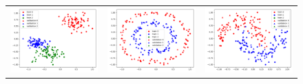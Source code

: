 \documentclass[12pt, a4paper,  nobibnotes]{article}
\begin{document}
\begin{figure}[H]
    \centering
    \begin{tabular}{ccc}
      \includegraphics[width=\thisfigurewidth\textwidth]{figures/fig_dataset_blobs.png} & 
      \includegraphics[width=\thisfigurewidth\textwidth]{figures/fig_dataset_circles.png} &
      \includegraphics[width=\thisfigurewidth\textwidth]{figures/fig_dataset_moons.png} \\

\end{tabular}
\end{figure}
\end{document}
